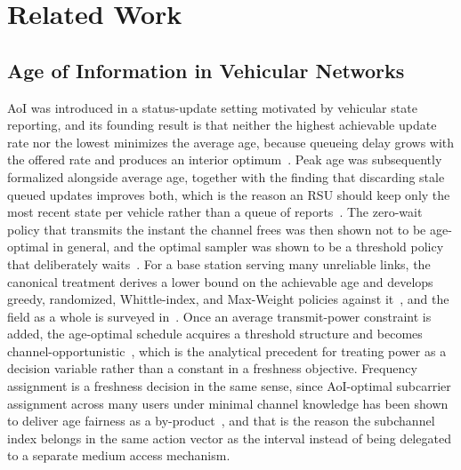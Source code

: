 \documentclass[journal]{IEEEtran}
\begin{document}
\section{Related Work}
\label{sec:related}

\subsection{Age of Information in Vehicular Networks}
AoI was introduced in a status-update setting motivated by vehicular state reporting, and its founding result is that neither the highest achievable update rate nor the lowest minimizes the average age, because queueing delay grows with the offered rate and produces an interior optimum~\cite{kaul2012}. Peak age was subsequently formalized alongside average age, together with the finding that discarding stale queued updates improves both, which is the reason an RSU should keep only the most recent state per vehicle rather than a queue of reports~\cite{costa2016}. The zero-wait policy that transmits the instant the channel frees was then shown not to be age-optimal in general, and the optimal sampler was shown to be a threshold policy that deliberately waits~\cite{sun2017}. For a base station serving many unreliable links, the canonical treatment derives a lower bound on the achievable age and develops greedy, randomized, Whittle-index, and Max-Weight policies against it~\cite{kadota2018}, and the field as a whole is surveyed in~\cite{yates2021}. Once an average transmit-power constraint is added, the age-optimal schedule acquires a threshold structure and becomes channel-opportunistic~\cite{tang2020}, which is the analytical precedent for treating power as a decision variable rather than a constant in a freshness objective. Frequency assignment is a freshness decision in the same sense, since AoI-optimal subcarrier assignment across many users under minimal channel knowledge has been shown to deliver age fairness as a by-product~\cite{han2021}, and that is the reason the subchannel index belongs in the same action vector as the interval instead of being delegated to a separate medium access mechanism.
\end{document}
